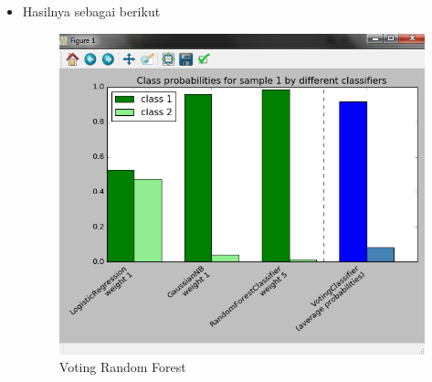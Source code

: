 \begin{itemize}
\begin{verbatim}
# plot annotations
plt.axvline(2.8, color='k', linestyle='dashed')
ax.set_xticks(ind + width)
ax.set_xticklabels(['LogisticRegression\nweight 1',
                    'GaussianNB\nweight 1',
                    'RandomForestClassifier\nweight 5',
                    'VotingClassifier\n(average probabilities)'],
                   rotation=40,
                   ha='right')
plt.ylim([0, 1])
plt.title('Class probabilities for sample 1 by different classifiers')
plt.legend([p1[0], p2[0]], ['class 1', 'class 2'], loc='upper left')
plt.tight_layout()
plt.show()
\end{verbatim}
\item
Hasilnya sebagai berikut 
\begin{figure}[ht]
\centering
\includegraphics[scale=0.5]{figures/teori6.png}
\caption{Voting Random Forest}
\label{Contoh}
\end{figure}
\end{itemize}





